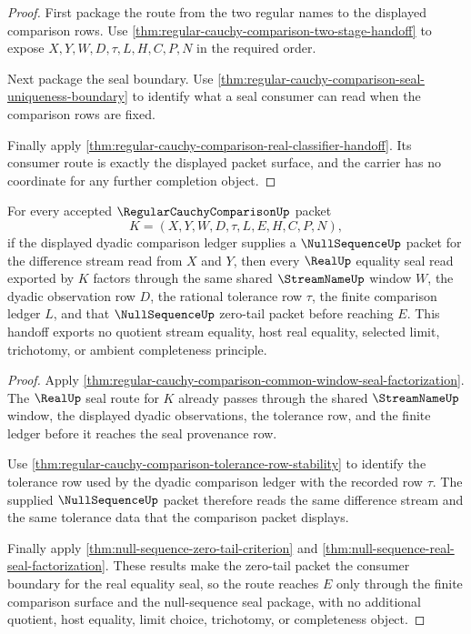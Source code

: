 \begin{proof}
First package the route from the two regular names to the displayed comparison rows. Use \autoref{thm:regular-cauchy-comparison-two-stage-handoff} to expose $X,Y,W,D,\tau,L,H,C,P,N$ in the required order.

Next package the seal boundary. Use \autoref{thm:regular-cauchy-comparison-seal-uniqueness-boundary} to identify what a seal consumer can read when the comparison rows are fixed.

Finally apply \autoref{thm:regular-cauchy-comparison-real-classifier-handoff}. Its consumer route is exactly the displayed packet surface, and the carrier has no coordinate for any further completion object.
\end{proof}

\begin{theorem}
\label{thm:regular-cauchy-comparison-nullsequence-handoff}
For every accepted $\RegularCauchyComparisonUp$ packet
$$
K=(X,Y,W,D,\tau,L,E,H,C,P,N),
$$
if the displayed dyadic comparison ledger supplies a $\NullSequenceUp$ packet for the difference stream read from $X$ and $Y$, then every $\RealUp$ equality seal read exported by $K$ factors through the same shared $\StreamNameUp$ window $W$, the dyadic observation row $D$, the rational tolerance row $\tau$, the finite comparison ledger $L$, and that $\NullSequenceUp$ zero-tail packet before reaching $E$. This handoff exports no quotient stream equality, host real equality, selected limit, trichotomy, or ambient completeness principle.
\end{theorem}

\begin{proof}
Apply \autoref{thm:regular-cauchy-comparison-common-window-seal-factorization}. The $\RealUp$ seal route for $K$ already passes through the shared $\StreamNameUp$ window, the displayed dyadic observations, the tolerance row, and the finite ledger before it reaches the seal provenance row.

Use \autoref{thm:regular-cauchy-comparison-tolerance-row-stability} to identify the tolerance row used by the dyadic comparison ledger with the recorded row $\tau$. The supplied $\NullSequenceUp$ packet therefore reads the same difference stream and the same tolerance data that the comparison packet displays.

Finally apply \autoref{thm:null-sequence-zero-tail-criterion} and \autoref{thm:null-sequence-real-seal-factorization}. These results make the zero-tail packet the consumer boundary for the real equality seal, so the route reaches $E$ only through the finite comparison surface and the null-sequence seal package, with no additional quotient, host equality, limit choice, trichotomy, or completeness object.
\end{proof}

